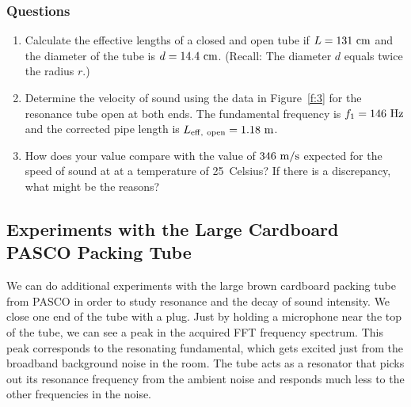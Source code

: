 \documentclass[11pt]{NSF}
\def\ben{\begin{enumerate}}
\def\een{\end{enumerate}}
\def\i{\item{}}
\begin{document}
\subsubsection*{Questions}
\ben
\i Calculate the effective lengths of a closed and open
tube if $L=131~{\rm cm}$ and the diameter of the tube
is $d=14.4~{\rm cm}$.  
(Recall: The diameter  $d$ equals twice the radius $r$.)

\i Determine the velocity of sound using the data in 
Figure~\ref{f:3} for the resonance tube open at both ends.
The fundamental frequency is $f_1 = 146~{\rm Hz}$ and the
corrected pipe length is $L_{\rm eff,\ open}=1.18~{\rm m}$.

\i How does your value compare with the value of 
$346~{\rm m/s}$ expected for the speed of sound at
at a temperature of 25~Celsius?
If there is a discrepancy, what might be the reasons?

\een

\subsection{Experiments with the Large Cardboard PASCO Packing Tube}

We can do additional experiments with the large brown cardboard packing 
tube from PASCO in order to study resonance and the decay of sound intensity. 
We close one end of the tube with a plug. 
Just by holding a microphone near the top of the tube, 
we can see a peak in the acquired FFT frequency spectrum. 
This peak corresponds to the resonating fundamental, which gets excited just from
the broadband background noise in the room. The tube acts as a resonator that
picks out its resonance frequency from the ambient noise and responds much less
to the other frequencies in the noise.
\end{document}
